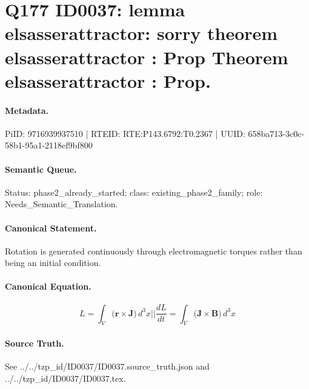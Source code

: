 \section*{Q177 ID0037: lemma elsasserattractor: sorry theorem elsasserattractor : Prop Theorem elsasserattractor : Prop.}
\paragraph{Metadata.}
PiID: 9716939937510 | RTEID: RTE:P143.6792:T0.2367 | UUID: 658ba713-3c0c-58b1-95a1-2118ef9bf800

\paragraph{Semantic Queue.}
Status: phase2\_already\_started; class: existing\_phase2\_family; role: Needs\_Semantic\_Translation.

\paragraph{Canonical Statement.}
Rotation is generated continuously through electromagnetic torques rather than being an initial condition.

\paragraph{Canonical Equation.}
\[
L = \int_{V} \bigl( \mathbf{r}\times\mathbf{J} \bigr)\,d^{3}x || \frac{dL}{dt} = \int_{V} \bigl( \mathbf{J}\times\mathbf{B} \bigr)\,d^{3}x
\]

\paragraph{Source Truth.}
See ../../tzp\_id/ID0037/ID0037.source\_truth.json and ../../tzp\_id/ID0037/ID0037.tex.
